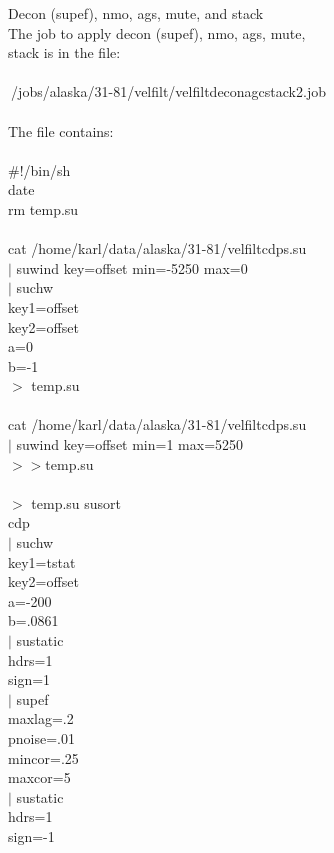 Decon (supef), nmo, ags, mute, and stack \\
The job to apply decon (supef), nmo, ags, mute,  \\
stack is in the file: \\
 \\
$~$/jobs/alaska/31-81/velfilt/velfiltdeconagcstack2.job \\
 \\
The file contains: \\
\\
\#!/bin/sh \\
date \\
rm temp.su \\
 \\
cat  /home/karl/data/alaska/31-81/velfiltcdps.su \ \\
$|$ suwind key=offset min=-5250 max=0 \ \\
$|$ suchw \ \\
      key1=offset \ \\
      key2=offset \ \\
      a=0 \ \\
      b=-1 \ \\
$>$ temp.su \\
 \\
cat  /home/karl/data/alaska/31-81/velfiltcdps.su \ \\
$|$ suwind key=offset min=1 max=5250 \ \\
$> >$temp.su \\
 \\
$>$ temp.su susort \ \\
    cdp \ \\
$|$ suchw \ \\
      key1=tstat \ \\
      key2=offset \ \\
      a=-200 \ \\
      b=.0861 \ \\
$|$ sustatic \ \\
      hdrs=1 \ \\
      sign=1 \ \\
$|$ supef \ \\
    maxlag=.2 \ \\
    pnoise=.01 \ \\
    mincor=.25 \ \\
    maxcor=5 \ \\
$|$ sustatic \ \\
      hdrs=1 \ \\
      sign=-1 \ \\
